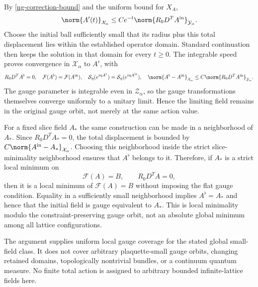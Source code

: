 By \eqref{ng-correction-bound} and the uniform bound for $X_A$,
\begin{equation}\label{ng-flow-speed}
 \norm{A'(t)}_{\mathcal X_\alpha}
    \le Ce^{-t}\norm{R_0D^TA^{\rm in}}_{\mathcal Y_\alpha}.
\end{equation}
Choose the initial ball sufficiently small that its radius plus
this total displacement lies within the established operator
domain. Standard continuation then keeps the solution in that
domain for every $t\ge0$. The integrable speed proves convergence
in $\mathcal X_\alpha$ to $A^\flat$, with
\begin{equation}\label{ng-flow-limit}
 R_0D^TA^\flat=0,\quad
 \mathcal F(A^\flat)=\mathcal F(A^{\rm in}),\quad
 \mathcal S_\eta(e^{i\eta A^\flat})
          =\mathcal S_\eta(e^{i\eta A^{\rm in}}),\quad
 \norm{A^\flat-A^{\rm in}}_{\mathcal X_\alpha}
       \le C\norm{R_0D^TA^{\rm in}}_{\mathcal Y_\alpha}.
\end{equation}
The gauge parameter is integrable even in $\mathcal Z_\alpha$,
so the gauge transformations themselves converge uniformly to a
unitary limit. Hence the limiting field remains in the original
gauge orbit, not merely at the same action value.

For a fixed slice field $A_*$ the same construction can be made
in a neighborhood of $A_*$. Since $R_0D^TA_*=0$,
the total displacement is bounded by
$C\norm{A^{\rm in}-A_*}_{\mathcal X_\alpha}$.
Choosing this neighborhood inside the strict slice-minimality
neighborhood ensures that $A^\flat$ belongs to it. Therefore,
if $A_*$ is a strict local minimum on
\[
 \mathcal F(A)=B,\qquad R_0D^TA=0,
\]
then it is a local minimum of $\mathcal F(A)=B$ without imposing
the flat gauge condition. Equality in a sufficiently small
neighborhood implies $A^\flat=A_*$ and hence that the initial
field is gauge equivalent to $A_*$. This is local minimality
modulo the constraint-preserving gauge orbit, not an absolute
global minimum among all lattice configurations.

The argument supplies uniform local gauge coverage for the stated
global small-field class. It does not cover arbitrary plaquette-small
gauge orbits, changing retained domains, topologically nontrivial
bundles, or a continuum quantum measure. No finite total action is
assigned to arbitrary bounded infinite-lattice fields here.
